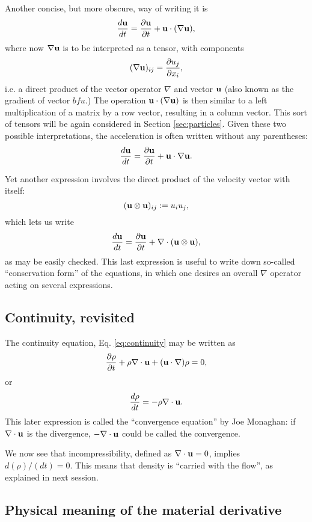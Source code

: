 Another concise, but more obscure, way of writing it is
\[
\frac{d \mathbf{u}  }{dt} =
\frac{\partial \mathbf{u} }{\partial t} +
\mathbf{u} \cdot  ( \nabla  \mathbf{u} ) ,
\]
where now $\nabla  \mathbf{u}$ is to be interpreted as a tensor, with
components
\begin{equation}
  \label{eq:nabla_u_def}
  (\nabla  \mathbf{u})_{ij} = \frac{\partial u_j}{\partial x_i} ,
\end{equation}
i.e. a direct product of the vector operator $\nabla$ and vector
$\mathbf{u}$ (also known as the gradient of vector $bfu$.) The operation
$\mathbf{u} \cdot ( \nabla \mathbf{u} )$ is then similar to a left multiplication
of a matrix by a row vector, resulting in a column vector. This sort
of tensors will be again considered in Section \ref{sec:particles}.
Given these two possible interpretations, the acceleration is often
written without any parentheses:
\[
\frac{d \mathbf{u}  }{dt} =
\frac{\partial \mathbf{u} }{\partial t} +
\mathbf{u} \cdot  \nabla  \mathbf{u} .
\]


Yet another expression involves the direct product of the velocity
vector with itself:
\[
( \mathbf{u} \otimes \mathbf{u} )_{ij} := u_i u_j ,
\]
which lets us write
\begin{equation}
  \label{eq:Euler_uu}
    \frac{d \mathbf{u}  }{dt} =
    \frac{\partial \mathbf{u} }{\partial t} +
    \nabla \cdot ( \mathbf{u} \otimes \mathbf{u} ),  
\end{equation}
as may be easily checked. This last expression is useful to write down
so-called ``conservation form'' of the equations, in which one desires
an overall $\nabla$ operator acting on several expressions.


\subsection{Continuity, revisited}
\label{sec:continuity2}

The continuity equation, Eq. \ref{eq:continuity} may be written as
\[
\frac{\partial \rho }{\partial t} +
\rho \nabla \cdot \mathbf{u} +
(\mathbf{u} \cdot \nabla) \rho = 0 ,
\]
or
\[
\frac{d \rho }{d t} = 
 - \rho \nabla  \cdot \mathbf{u} .
\]
This later expression is called the ``convergence equation'' by Joe
Monaghan: if $\nabla \cdot \mathbf{u} $ is the divergence, $ - \nabla \cdot
\mathbf{u} $ could be called the convergence.

We now see that incompressibility, defined as $\nabla \cdot \mathbf{u} = 0
$, implies $d(\rho)/(dt) = 0$. This means that density is ``carried
with the flow'', as explained in next session.

\subsection{Physical meaning of the material derivative}

